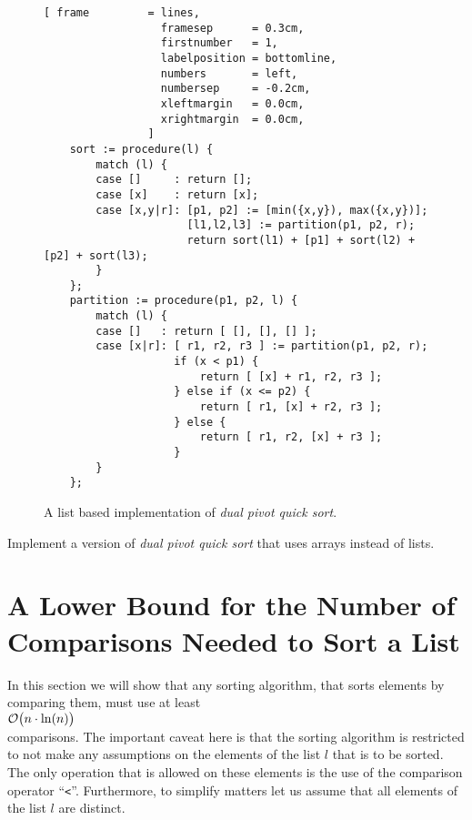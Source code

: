 \begin{figure}[!ht]
\centering
\begin{Verbatim}[ frame         = lines, 
                  framesep      = 0.3cm, 
                  firstnumber   = 1,
                  labelposition = bottomline,
                  numbers       = left,
                  numbersep     = -0.2cm,
                  xleftmargin   = 0.0cm,
                  xrightmargin  = 0.0cm,
                ]
    sort := procedure(l) {
        match (l) {
        case []     : return [];
        case [x]    : return [x];
        case [x,y|r]: [p1, p2] := [min({x,y}), max({x,y})];
                      [l1,l2,l3] := partition(p1, p2, r);
                      return sort(l1) + [p1] + sort(l2) + [p2] + sort(l3);
        }
    };
    partition := procedure(p1, p2, l) {
        match (l) {
        case []   : return [ [], [], [] ];
        case [x|r]: [ r1, r2, r3 ] := partition(p1, p2, r);
                    if (x < p1) {
                        return [ [x] + r1, r2, r3 ];
                    } else if (x <= p2) {
                        return [ r1, [x] + r2, r3 ];
                    } else {
                        return [ r1, r2, [x] + r3 ];
                    }
        }
    };
\end{Verbatim}
\vspace*{-0.3cm}
\caption{A list based implementation of \emph{dual pivot quick sort}.}
\label{fig:dual-pivot-quick-sort.stlx}
\end{figure}

\exercise
Implement a version of \emph{dual pivot quick sort} that uses arrays instead of lists.


\section[A Lower Bound]{A Lower Bound for the Number of Comparisons Needed to Sort a List}
In this section we will show that any sorting algorithm, that sorts elements by comparing them, must
use at least 
\\[0.2cm]
\hspace*{1.3cm}
 $\mathcal{O}\bigl(n \cdot \ln(n)\bigr)$ 
\\[0.2cm]
comparisons.  The important caveat here is that the sorting algorithm is restricted to not make any assumptions
on the elements of the list $l$ that is to be sorted.  The only operation that is allowed on these
elements is the use of the comparison operator ``\texttt{<}''.  Furthermore, to simplify matters let
us assume that all elements of the list $l$ are distinct.

